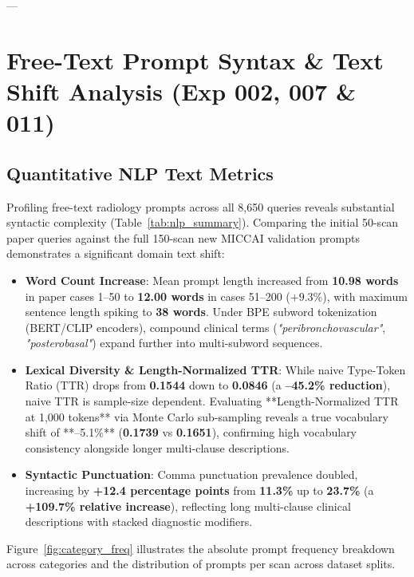 \documentclass[11pt,a4paper]{article}
\begin{document}
---

\section{Free-Text Prompt Syntax \& Text Shift Analysis (Exp 002, 007 \& 011)}

\subsection{Quantitative NLP Text Metrics}
Profiling free-text radiology prompts across all 8,650 queries reveals substantial syntactic complexity (Table~\ref{tab:nlp_summary}). Comparing the initial 50-scan paper queries against the full 150-scan new MICCAI validation prompts demonstrates a significant domain text shift:
\begin{itemize}
    \item \textbf{Word Count Increase}: Mean prompt length increased from \textbf{10.98 words} in paper cases 1--50 to \textbf{12.00 words} in cases 51--200 ($+9.3\%$), with maximum sentence length spiking to \textbf{38 words}. Under BPE subword tokenization (BERT/CLIP encoders), compound clinical terms (\textit{"peribronchovascular"}, \textit{"posterobasal"}) expand further into multi-subword sequences.
    \item \textbf{Lexical Diversity \& Length-Normalized TTR}: While naive Type-Token Ratio (TTR) drops from \textbf{0.1544} down to \textbf{0.0846} (a \textbf{--45.2\% reduction}), naive TTR is sample-size dependent. Evaluating **Length-Normalized TTR at 1,000 tokens** via Monte Carlo sub-sampling reveals a true vocabulary shift of **--5.1\%** (\textbf{0.1739} vs \textbf{0.1651}), confirming high vocabulary consistency alongside longer multi-clause descriptions.
    \item \textbf{Syntactic Punctuation}: Comma punctuation prevalence doubled, increasing by \textbf{+12.4 percentage points} from \textbf{11.3\%} up to \textbf{23.7\%} (a \textbf{+109.7\% relative increase}), reflecting long multi-clause clinical descriptions with stacked diagnostic modifiers.
\end{itemize}

Figure~\ref{fig:category_freq} illustrates the absolute prompt frequency breakdown across categories and the distribution of prompts per scan across dataset splits.
\end{document}
